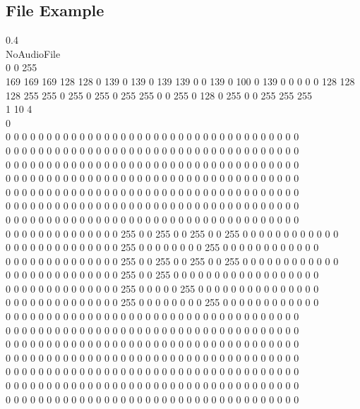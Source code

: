 \documentclass[12pt]{extarticle}
\begin{document}
\subsection{File Example}

0.4  \\
NoAudioFile\\
0 0 255 \\
169 169 169 128 128 0 139 0 139 0 139 139 0 0 139 0 100 0 139 0 0 0 0 0 128 128 128 255 255 0 255 0 255 0 255 255 0 0 255 0 128 0 255 0 0 255 255 255 \\
1 10 4 \\
0 \\
0 0 0 0 0 0 0 0 0 0 0 0 0 0 0 0 0 0 0 0 0 0 0 0 0 0 0 0 0 0 0 0 0 0 0 0 \\
0 0 0 0 0 0 0 0 0 0 0 0 0 0 0 0 0 0 0 0 0 0 0 0 0 0 0 0 0 0 0 0 0 0 0 0 \\
0 0 0 0 0 0 0 0 0 0 0 0 0 0 0 0 0 0 0 0 0 0 0 0 0 0 0 0 0 0 0 0 0 0 0 0 \\
0 0 0 0 0 0 0 0 0 0 0 0 0 0 0 0 0 0 0 0 0 0 0 0 0 0 0 0 0 0 0 0 0 0 0 0 \\
0 0 0 0 0 0 0 0 0 0 0 0 0 0 0 0 0 0 0 0 0 0 0 0 0 0 0 0 0 0 0 0 0 0 0 0 \\
0 0 0 0 0 0 0 0 0 0 0 0 0 0 0 0 0 0 0 0 0 0 0 0 0 0 0 0 0 0 0 0 0 0 0 0 \\
0 0 0 0 0 0 0 0 0 0 0 0 0 0 0 0 0 0 0 0 0 0 0 0 0 0 0 0 0 0 0 0 0 0 0 0 \\
0 0 0 0 0 0 0 0 0 0 0 0 0 0 255 0 0 255 0 0 255 0 0 255 0 0 0 0 0 0 0 0 0 0 0 0\\ 
0 0 0 0 0 0 0 0 0 0 0 0 0 0 255 0 0 0 0 0 0 0 0 255 0 0 0 0 0 0 0 0 0 0 0 0 \\
0 0 0 0 0 0 0 0 0 0 0 0 0 0 255 0 0 255 0 0 255 0 0 255 0 0 0 0 0 0 0 0 0 0 0 0\\ 
0 0 0 0 0 0 0 0 0 0 0 0 0 0 255 0 0 255 0 0 0 0 0 0 0 0 0 0 0 0 0 0 0 0 0 0 \\
0 0 0 0 0 0 0 0 0 0 0 0 0 0 255 0 0 0 0 0 255 0 0 0 0 0 0 0 0 0 0 0 0 0 0 0 \\
0 0 0 0 0 0 0 0 0 0 0 0 0 0 255 0 0 0 0 0 0 0 0 255 0 0 0 0 0 0 0 0 0 0 0 0 \\
0 0 0 0 0 0 0 0 0 0 0 0 0 0 0 0 0 0 0 0 0 0 0 0 0 0 0 0 0 0 0 0 0 0 0 0 \\
0 0 0 0 0 0 0 0 0 0 0 0 0 0 0 0 0 0 0 0 0 0 0 0 0 0 0 0 0 0 0 0 0 0 0 0 \\
0 0 0 0 0 0 0 0 0 0 0 0 0 0 0 0 0 0 0 0 0 0 0 0 0 0 0 0 0 0 0 0 0 0 0 0 \\
0 0 0 0 0 0 0 0 0 0 0 0 0 0 0 0 0 0 0 0 0 0 0 0 0 0 0 0 0 0 0 0 0 0 0 0 \\
0 0 0 0 0 0 0 0 0 0 0 0 0 0 0 0 0 0 0 0 0 0 0 0 0 0 0 0 0 0 0 0 0 0 0 0 \\
0 0 0 0 0 0 0 0 0 0 0 0 0 0 0 0 0 0 0 0 0 0 0 0 0 0 0 0 0 0 0 0 0 0 0 0 \\
0 0 0 0 0 0 0 0 0 0 0 0 0 0 0 0 0 0 0 0 0 0 0 0 0 0 0 0 0 0 0 0 0 0 0 0 \\\\
\end{document}

